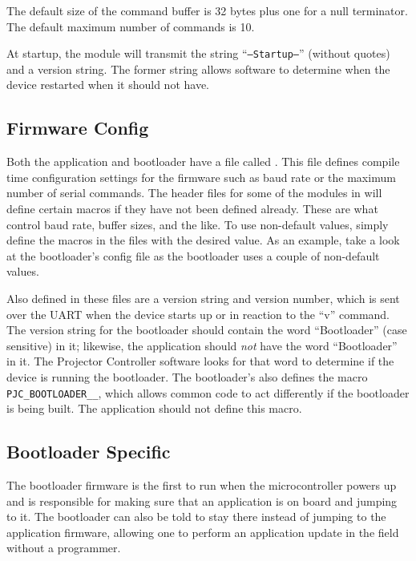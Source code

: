 \documentclass{article}
\begin{document}
The default size of the command buffer is 32 bytes plus one for a null terminator.  The default
maximum number of commands is 10.

At startup, the module will transmit the string ``\texttt{---Startup---}'' (without quotes) and a
version string.  The former string allows software to determine when the device restarted when it
should not have.

\subsection{Firmware Config} \label{ssec:FWConfig}
Both the application and bootloader have a file called .  This file defines
compile time configuration settings for the firmware such as baud rate or the maximum number of
serial commands.  The header files for some of the modules in  will define
certain macros if they have not been defined already.  These are what control baud rate, buffer
sizes, and the like.  To use non-default values, simply define the macros in the 
files with the desired value.  As an example, take a look at the bootloader's config file
 as the bootloader uses a couple of non-default values.

Also defined in these files are a version string and version number, which is sent over the UART
when the device starts up or in reaction to the ``v'' command.  The version string for the
bootloader should contain the word ``Bootloader'' (case sensitive) in it; likewise, the application
should \emph{not} have the word ``Bootloader'' in it.  The Projector Controller software looks for
that word to determine if the device is running the bootloader.
The bootloader's  also defines the macro \texttt{PJC\_BOOTLOADER\_\_}, which allows
common code to act differently if the bootloader is being built.  The application should not define
this macro.

\subsection{Bootloader Specific} \label{ssec:FWBootloader}
The bootloader firmware is the first to run when the microcontroller powers up and is responsible
for making sure that an application is on board and jumping to it.  The bootloader can also be told
to stay there instead of jumping to the application firmware, allowing one to perform an application
update in the field without a programmer.
\end{document}
